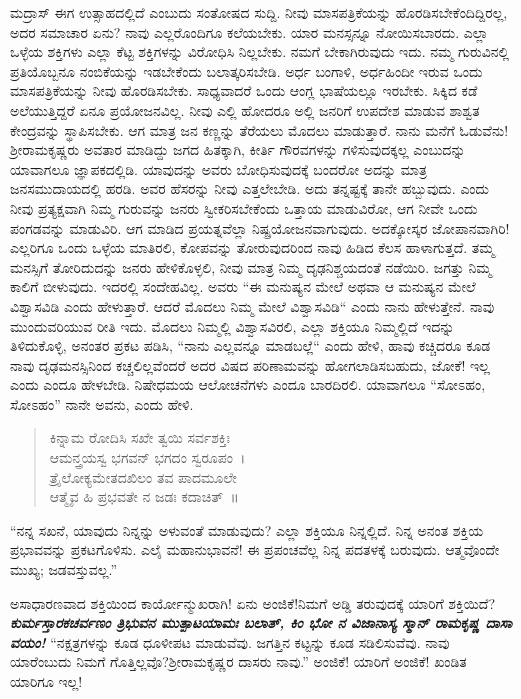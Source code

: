 ಮದ್ರಾಸ್ ಈಗ ಉತ್ಸಾಹದಲ್ಲಿದೆ ಎಂಬುದು ಸಂತೋಷದ ಸುದ್ದಿ. ನೀವು ಮಾಸಪತ್ರಿಕೆಯನ್ನು ಹೊರಡಿಸಬೇಕೆಂದಿದ್ದಿರಲ್ಲ, ಅದರ ಸಮಾಚಾರ ಏನು? ನಾವು ಎಲ್ಲರೊಂದಿಗೂ ಕಲೆಯಬೇಕು. ಯಾರ ಮನಸ್ಸನ್ನೂ ನೋಯಿಸಬಾರದು. ಎಲ್ಲಾ ಒಳ್ಳೆಯ ಶಕ್ತಿಗಳು ಎಲ್ಲಾ ಕೆಟ್ಟ ಶಕ್ತಿಗಳನ್ನು ವಿರೋಧಿಸಿ ನಿಲ್ಲಬೇಕು. ನಮಗೆ ಬೇಕಾಗಿರುವುದು ಇದು. ನಮ್ಮ ಗುರುವಿನಲ್ಲಿ ಪ್ರತಿಯೊಬ್ಬನೂ ನಂಬಿಕೆಯನ್ನು ಇಡಬೇಕೆಂದು ಬಲಾತ್ಕರಿಸಬೇಡಿ. ಅರ್ಧ ಬಂಗಾಳಿ, ಅರ್ಧಹಿಂದೀ ಇರುವ ಒಂದು ಮಾಸಪತ್ರಿಕೆಯನ್ನು ನೀವು ಹೊರಡಿಸಬೇಕು. ಸಾಧ್ಯವಾದರೆ ಒಂದು ಆಂಗ್ಲ ಭಾಷೆಯಲ್ಲೂ ಇರಬೇಕು. ಸಿಕ್ಕಿದ ಕಡೆ ಅಲೆಯುತ್ತಿದ್ದರೆ ಏನೂ ಪ್ರಯೋಜನವಿಲ್ಲ. ನೀವು ಎಲ್ಲಿ ಹೋದರೂ ಅಲ್ಲಿ ಜನರಿಗೆ ಉಪದೇಶ ಮಾಡುವ ಶಾಶ್ವತ ಕೇಂದ್ರವನ್ನು ಸ್ಥಾಪಿಸಬೇಕು. ಆಗ ಮಾತ್ರ ಜನ ಕಣ್ಣನ್ನು ತೆರೆಯಲು ಮೊದಲು ಮಾಡುತ್ತಾರೆ. ನಾನು ಮನೆಗೆ ಓಡುವೆನು! ಶ‍್ರೀರಾಮಕೃಷ್ಣರು ಅವತಾರ ಮಾಡಿದ್ದು ಜಗದ ಹಿತಕ್ಕಾಗಿ, ಕೀರ್ತಿ ಗೌರವಗಳನ್ನು ಗಳಿಸುವುದಕ್ಕಲ್ಲ ಎಂಬುದನ್ನು ಯಾವಾಗಲೂ ಜ್ಞಾಪಕದಲ್ಲಿಡಿ. ಯಾವುದನ್ನು ಅವರು ಬೋಧಿಸುವುದಕ್ಕೆ ಬಂದರೋ ಅದನ್ನು ಮಾತ್ರ ಜನಸಮುದಾಯದಲ್ಲಿ ಹರಡಿ. ಅವರ ಹೆಸರನ್ನು ನೀವು ಎತ್ತಲೇಬೇಡಿ. ಅದು ತನ್ನಷ್ಟಕ್ಕೆ ತಾನೇ ಹಬ್ಬುವುದು. ಎಂದು ನೀವು ಪ್ರತ್ಯಕ್ಷವಾಗಿ ನಿಮ್ಮ ಗುರುವನ್ನು ಜನರು ಸ್ವೀಕರಿಸಬೇಕೆಂದು ಒತ್ತಾಯ ಮಾಡುವಿರೋ, ಆಗ ನೀವೇ ಒಂದು ಪಂಗಡವನ್ನು ಮಾಡುವಿರಿ. ಆಗ ಮಾಡಿದ ಪ್ರಯತ್ನವೆಲ್ಲಾ ನಿಷ್ಪ್ರಯೋಜನವಾಗುವುದು. ಅದಕ್ಕೋಸ್ಕರ ಜೋಪಾನವಾಗಿರಿ!ಎಲ್ಲರಿಗೂ ಒಂದು ಒಳ್ಳೆಯ ಮಾತಿರಲಿ, ಕೋಪವನ್ನು ತೋರುವುದರಿಂದ ನಾವು ಹಿಡಿದ ಕೆಲಸ ಹಾಳಾಗುತ್ತದೆ. ತಮ್ಮ ಮನಸ್ಸಿಗೆ ತೋರಿದುದನ್ನು ಜನರು ಹೇಳಿಕೊಳ್ಳಲಿ, ನೀವು ಮಾತ್ರ ನಿಮ್ಮ ದೃಢನಿಶ್ಚಯದಂತೆ ನಡೆಯಿರಿ. ಜಗತ್ತು ನಿಮ್ಮ ಕಾಲಿಗೆ ಬೀಳುವುದು. ಇದರಲ್ಲಿ ಸಂದೇಹವಿಲ್ಲ. ಅವರು “ಈ ಮನುಷ್ಯನ ಮೇಲೆ ಅಥವಾ ಆ ಮನುಷ್ಯನ ಮೇಲೆ ವಿಶ್ವಾಸವಿಡಿ ಎಂದು ಹೇಳುತ್ತಾರೆ. ಆದರೆ ಮೊದಲು ನಿಮ್ಮ ಮೇಲೆ ವಿಶ್ವಾಸವಿಡಿ“ ಎಂದು ನಾನು ಹೇಳುತ್ತೇನೆ. ನಾವು ಮುಂದುವರಿಯುವ ರೀತಿ ಇದು. ಮೊದಲು ನಿಮ್ಮಲ್ಲಿ ವಿಶ್ವಾಸವಿರಲಿ, ಎಲ್ಲಾ ಶಕ್ತಿಯೂ ನಿಮ್ಮಲ್ಲಿದೆ \enginline{-}ಇದನ್ನು ತಿಳಿದುಕೊಳ್ಳಿ, ಅನಂತರ ಪ್ರಕಟ ಪಡಿಸಿ, “ನಾನು ಎಲ್ಲವನ್ನೂ ಮಾಡಬಲ್ಲೆ“ ಎಂದು ಹೇಳಿ, ಹಾವು ಕಚ್ಚಿದರೂ ಕೂಡ ನಾವು ದೃಢಮನಸ್ಸಿನಿಂದ ಕಚ್ಚಲಿಲ್ಲವೆಂದರೆ ಅದರ ವಿಷದ ಪರಿಣಾಮವನ್ನು ಹೋಗಲಾಡಿಸಬಹುದು, ಜೋಕೆ! ಇಲ್ಲ ಎಂದು ಎಂದೂ ಹೇಳಬೇಡಿ. ನಿಷೇಧಮಯ ಆಲೋಚನೆಗಳು ಎಂದೂ ಬಾರದಿರಲಿ. ಯಾವಾಗಲೂ “ಸೋಽಹಂ, ಸೋಽಹಂ” ನಾನೇ ಅವನು, ಎಂದು ಹೇಳಿ.

\begin{verse}
 ಕಿನ್ನಾಮ ರೋದಿಸಿ ಸಖೇ ತ್ವಯಿ ಸರ್ವಶಕ್ತಿಃ\\
 ಆಮನ್ತ್ರಯಸ್ವ ಭಗವನ್ ಭಗದಂ ಸ್ವರೂಪಂ~।\\
 ತ್ರೈಲೋಕ್ಯಮೇತದಖಿಲಂ ತವ ಪಾದಮೂಲೇ\\
 ಆತ್ಮೈವ ಹಿ ಪ್ರಭವತೇ ನ ಜಡಃ ಕದಾಚಿತ್~॥ 
\end{verse}

“ನನ್ನ ಸಖನೆ, ಯಾವುದು ನಿನ್ನನ್ನು ಅಳುವಂತೆ ಮಾಡುವುದು? ಎಲ್ಲಾ ಶಕ್ತಿಯೂ ನಿನ್ನಲ್ಲಿದೆ. ನಿನ್ನ ಅನಂತ ಶಕ್ತಿಯ ಪ್ರಭಾವವನ್ನು ಪ್ರಕಟಗೊಳಿಸು. ಎಲೈ ಮಹಾನುಭಾವನೆ! ಈ ಪ್ರಪಂಚವೆಲ್ಲ ನಿನ್ನ ಪದತಳಕ್ಕೆ ಬರುವುದು. ಆತ್ಮವೊಂದೇ ಮುಖ್ಯ; ಜಡವಸ್ತುವಲ್ಲ.”

ಅಸಾಧಾರಣವಾದ ಶಕ್ತಿಯಿಂದ ಕಾರ್ಯೋನ್ಮುಖರಾಗಿ! ಏನು ಅಂಜಿಕೆ!ನಿಮಗೆ ಅಡ್ಡಿ ತರುವುದಕ್ಕೆ ಯಾರಿಗೆ ಶಕ್ತಿಯಿದೆ? \textbf{\textit{ಕುರ್ಮಸ್ತಾರಕಚರ್ವಣಂ ತ್ರಿಭುವನ ಮುತ್ಪಾಟಯಾಮಃ ಬಲಾತ್, ಕಿಂ ಭೋ ನ ವಿಜಾನಾಸ್ಯ ಸ್ಮಾನ್ ರಾಮಕೃಷ್ಣ ದಾಸಾ ವಯಂ!}} “ನಕ್ಷತ್ರಗಳನ್ನು ಕೂಡ ಧೂಳೀಪಟ ಮಾಡುವೆವು. ಜಗತ್ತಿನ ಕಟ್ಟನ್ನು ಕೂಡ ಸಡಿಲಿಸುವೆವು. ನಾವು ಯಾರೆಂಬುದು ನಿಮಗೆ ಗೊತ್ತಿಲ್ಲವೊ?ಶ‍್ರೀರಾಮಕೃಷ್ಣರ ದಾಸರು ನಾವು.” ಅಂಜಿಕೆ! ಯಾರಿಗೆ ಅಂಜಿಕೆ! ಖಂಡಿತ ಯಾರಿಗೂ ಇಲ್ಲ!

